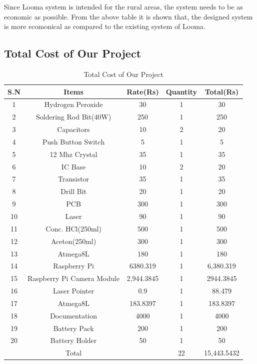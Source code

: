 \documentclass[12pt, a4paper]{article}
\begin{document}
Since Looma system is intended for the rural areas, the system needs to be as economic as possible. From the above table it is shown that, the designed system is more ecomonical as compared to the existing system of Looma. 
\clearpage
\subsection{Total Cost of Our Project}
\begin{table}[ht]
\begin{tabular}{|c|c|c|c|c|}
\hline
	S.N & Items & Rate(Rs) & Quantity & Total(Rs) \\
\hline
	1 & Hydrogen Peroxide & 30 & 1 & 30 \\
\hline
	2 & Soldering Rod Bit(40W) & 250 & 1 & 250 \\
\hline
	3 & Capacitors & 10 & 2 & 20 \\
\hline
	4 & Push Button Switch & 5 & 1 & 5 \\
\hline
	5 & 12 Mhz Crystal & 35 & 1 & 35 \\
\hline
	6 & IC Base & 10 & 2 & 20 \\
\hline
	7 & Transistor & 35 & 1 & 35 \\
\hline
	8 & Drill Bit & 20 & 1 & 20 \\
\hline
	9 & PCB & 300 & 1 & 300 \\
\hline
	10 & Laser & 90 & 1 & 90 \\
\hline
	11 & Conc. HCl(250ml) & 500 & 1 & 500 \\
\hline
	12 & Aceton(250ml) & 300 & 1 & 300 \\
\hline
	13 & Atmega8L & 180 & 1 & 180 \\
\hline
	14 & Raspberry Pi & 6380.319 & 1 & 6,380.319 \\
\hline
	15 & Raspberry Pi Camera Module & 2,944.3845 & 1 & 2944.3845 \\
\hline
	16 & Laser Pointer &  0.9 & 1 & 88.479 \\
\hline 
    17 & Atmega8L & 183.8397 & 1 & 183.8397 \\
\hline
	18 & Documentation &  4000 & 1 & 4000 \\
\hline
	19 & Battery Pack & 200 & 1 & 200 \\
\hline 
    20 & Battery Holder & 50 & 1 & 50 \\
\hline 
	   & Total & & 22 & 15,443.5432\\
\hline	   
\end{tabular}
\caption{Total Cost of Our Project}
\label{tb:sw}
\end{table}
\clearpage
\end{document}
